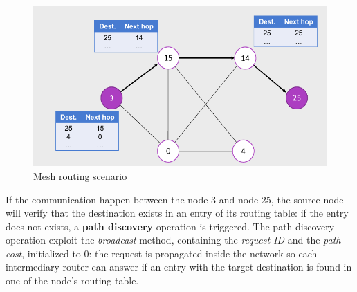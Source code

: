 \documentclass[10pt,a4paper]{report}
\theoremstyle{definition}
\begin{document}
\begin{figure}[h]
	\centering\includegraphics[scale=0.50]{images/Pasted image 20230524141323.png}
	\caption{Mesh routing scenario}
\end{figure}

If the communication happen between the node 3 and node 25, the source node will verify that the destination exists in an entry of its routing table: if the entry does not exists, a \textbf{path discovery} operation is triggered.
The path discovery operation exploit the \textit{broadcast} method, containing the \textit{request ID} and the \textit{path cost}, initialized to 0: the request is propagated inside the network so each intermediary router can answer if an entry with the target destination is found in one of the node's routing table.


	
	
	
	
	
\end{document}
